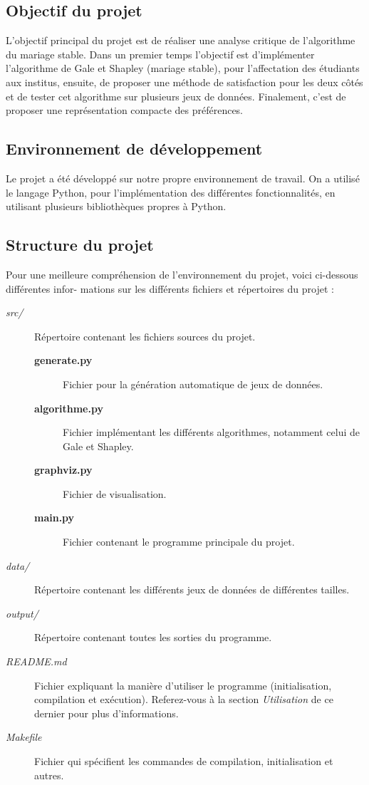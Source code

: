 \documentclass[12pt,titlepage]{article}
\begin{document}
\subsection*{Objectif du projet}

L'objectif principal du projet est de réaliser une analyse critique de l'algorithme du mariage stable. Dans un premier temps l'objectif est d'implémenter l'algorithme de Gale et Shapley (mariage stable), pour l'affectation des étudiants aux institus, ensuite, de proposer une méthode de satisfaction pour les deux côtés et de tester cet algorithme sur plusieurs jeux de données. Finalement, c'est de proposer une représentation compacte des préférences. 

\subsection*{Environnement de développement}

Le projet a été développé sur notre propre environnement de travail. On a utilisé le langage Python, pour l'implémentation des différentes fonctionnalités, en utilisant plusieurs bibliothèques propres à Python. 

\subsection*{Structure du projet}

Pour une meilleure compréhension de l’environnement du projet, voici ci-dessous différentes infor-
mations sur les différents fichiers et répertoires du projet :

\begin{description}
	\item[\textit{src/}] Répertoire contenant les fichiers sources du projet.
	\begin{description}
    \item[\textbf{generate.py}] Fichier pour la génération automatique de jeux de données.
    \item[\textbf{algorithme.py}] Fichier implémentant les différents algorithmes, notamment celui de Gale et Shapley.
    \item[\textbf{graphviz.py}] Fichier de visualisation.
    \item[\textbf{main.py}] Fichier contenant le programme principale du projet. 
  \end{description} 
	\item[\textit{data/}] Répertoire contenant les différents jeux de données de différentes tailles.
	\item[\textit{output/}] Répertoire contenant toutes les sorties du programme.	
	\item[\textit{README.md}] Fichier expliquant la manière d'utiliser le programme (initialisation, compilation et exécution). Referez-vous à la section \textit{Utilisation} de ce dernier pour plus d'informations.
	\item[\textit{Makefile}] Fichier qui spécifient les commandes de compilation, initialisation et autres.
\end{description}
\end{document}
